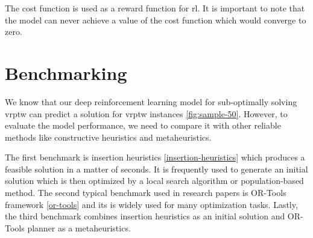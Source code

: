 The cost function is used as a reward function for \gls{rl}. It is important to note that the model can never achieve a value of the cost function which would converge to zero.
\newline

\section{Benchmarking}\label{benchmarking}
We know that our deep reinforcement learning model for sub-optimally solving \gls{vrptw} can predict a solution for \gls{vrptw} instances \ref{fig:sample-50}. However, to evaluate the model performance, we need to compare it with other reliable methods like constructive heuristics and metaheuristics.

The first benchmark is insertion heuristics \ref{insertion-heuristics} which produces a feasible solution in a matter of seconds. It is frequently used to generate an initial solution which is then optimized by a local search algorithm or population-based method. The second typical benchmark used in research papers is OR-Tools framework \ref{or-tools} and its is widely used for many optimization tasks. Lastly, the third benchmark combines insertion heuristics as an initial solution and OR-Tools planner as a metaheuristics.

\begin{table}[ht]
\centering
{}
\caption{Benchmarking of VRPTW solvers for problem size of 20 nodes.}
\label{tab:result-20}
\end{table} 

